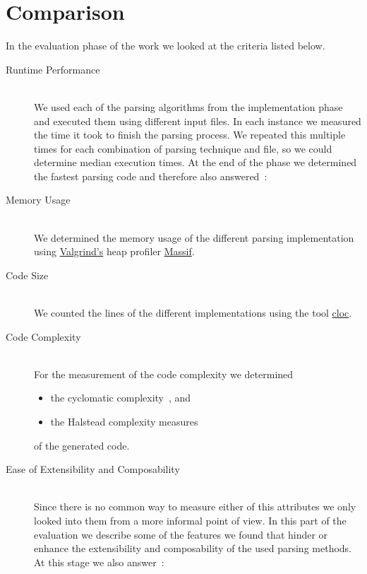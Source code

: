 \chapter{Comparison}

In the evaluation phase of the work we looked at the criteria listed below.

\begin{description}

  \item[Runtime Performance]~\\[0.1cm]
  We used each of the parsing algorithms from the implementation phase and executed them using different input files. In each instance we measured the time it took to finish the parsing process. We repeated this multiple times for each combination of parsing technique and file, so we could determine median execution times. At the end of the phase we determined the fastest parsing code and therefore also answered~:

  \speed*

  \item[Memory Usage]~\\[0.1cm]
  We determined the memory usage of the different parsing implementation using \href{http://valgrind.org}{Valgrind's} heap profiler \href{http://valgrind.org/docs/manual/ms-manual.html}{Massif}.

  \item[Code Size]~\\[0.1cm]
  We counted the lines of the different implementations using the tool \href{https://github.com/AlDanial/cloc}{cloc}.

  \item[Code Complexity]~\\[0.1cm]
  For the measurement of the code complexity we determined
  \begin{itemize}
    \item the cyclomatic complexity~\cite{mccabe1976complexity}, and
    \item the Halstead complexity measures~\cite{halstead1977elements}
  \end{itemize}
  of the generated code.

  \item[Ease of Extensibility and Composability]~\\[0.1cm]
  Since there is no common way to measure either of this attributes we only looked into them from a more informal point of view. In this part of the evaluation we describe some of the features we found that hinder or enhance the extensibility and composability of the used parsing methods. At this stage we also answer~:


\end{description}
